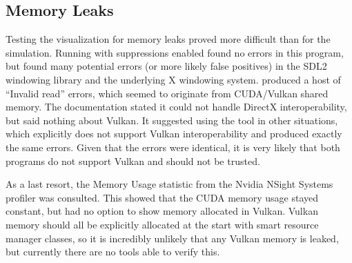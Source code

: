 \subsection{Memory Leaks}\label{sec:Results:Viz:Memory}
Testing the visualization for memory leaks proved more difficult than for the simulation.
Running  with suppressions enabled found no errors in this program, but found many potential errors (or more likely false positives) in the SDL2 windowing library and the underlying X windowing system.
 produced a host of ``Invalid read'' errors, which seemed to originate from CUDA/Vulkan shared memory.
The documentation stated it could not handle DirectX interoperability\cite{NvidiaCudaMemcheckIssues}, but said nothing about Vulkan.
It suggested using the  tool in other situations, which explicitly does not support Vulkan interoperability\cite{NvidiaComputeSanitizerRelease} and produced exactly the same errors.
Given that the errors were identical, it is very likely that both programs do not support Vulkan and should not be trusted.

As a last resort, the Memory Usage statistic from the Nvidia NSight Systems profiler was consulted.
This showed that the CUDA memory usage stayed constant, but had no option to show memory allocated in Vulkan.
Vulkan memory should all be explicitly allocated at the start with smart resource manager classes, so it is incredibly unlikely that any Vulkan memory is leaked, but currently there are no tools able to verify this.